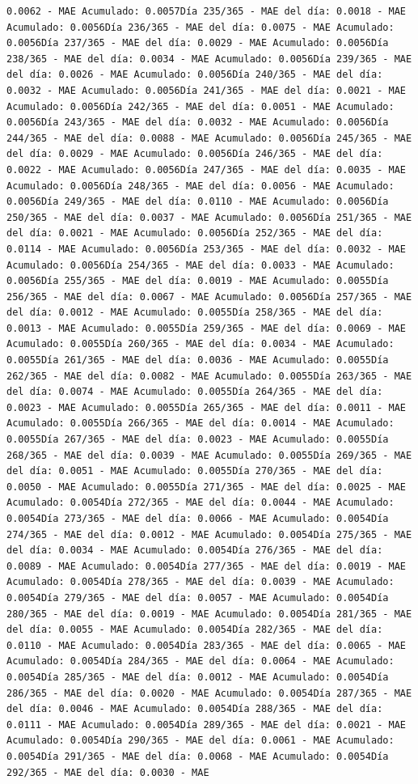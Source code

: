 \documentclass[
]{book}
\begin{document}
\begin{verbatim}
0.0062 - MAE Acumulado: 0.0057Día 235/365 - MAE del día: 0.0018 - MAE Acumulado: 0.0056Día 236/365 - MAE del día: 0.0075 - MAE Acumulado: 0.0056Día 237/365 - MAE del día: 0.0029 - MAE Acumulado: 0.0056Día 238/365 - MAE del día: 0.0034 - MAE Acumulado: 0.0056Día 239/365 - MAE del día: 0.0026 - MAE Acumulado: 0.0056Día 240/365 - MAE del día: 0.0032 - MAE Acumulado: 0.0056Día 241/365 - MAE del día: 0.0021 - MAE Acumulado: 0.0056Día 242/365 - MAE del día: 0.0051 - MAE Acumulado: 0.0056Día 243/365 - MAE del día: 0.0032 - MAE Acumulado: 0.0056Día 244/365 - MAE del día: 0.0088 - MAE Acumulado: 0.0056Día 245/365 - MAE del día: 0.0029 - MAE Acumulado: 0.0056Día 246/365 - MAE del día: 0.0022 - MAE Acumulado: 0.0056Día 247/365 - MAE del día: 0.0035 - MAE Acumulado: 0.0056Día 248/365 - MAE del día: 0.0056 - MAE Acumulado: 0.0056Día 249/365 - MAE del día: 0.0110 - MAE Acumulado: 0.0056Día 250/365 - MAE del día: 0.0037 - MAE Acumulado: 0.0056Día 251/365 - MAE del día: 0.0021 - MAE Acumulado: 0.0056Día 252/365 - MAE del día: 0.0114 - MAE Acumulado: 0.0056Día 253/365 - MAE del día: 0.0032 - MAE Acumulado: 0.0056Día 254/365 - MAE del día: 0.0033 - MAE Acumulado: 0.0056Día 255/365 - MAE del día: 0.0019 - MAE Acumulado: 0.0055Día 256/365 - MAE del día: 0.0067 - MAE Acumulado: 0.0056Día 257/365 - MAE del día: 0.0012 - MAE Acumulado: 0.0055Día 258/365 - MAE del día: 0.0013 - MAE Acumulado: 0.0055Día 259/365 - MAE del día: 0.0069 - MAE Acumulado: 0.0055Día 260/365 - MAE del día: 0.0034 - MAE Acumulado: 0.0055Día 261/365 - MAE del día: 0.0036 - MAE Acumulado: 0.0055Día 262/365 - MAE del día: 0.0082 - MAE Acumulado: 0.0055Día 263/365 - MAE del día: 0.0074 - MAE Acumulado: 0.0055Día 264/365 - MAE del día: 0.0023 - MAE Acumulado: 0.0055Día 265/365 - MAE del día: 0.0011 - MAE Acumulado: 0.0055Día 266/365 - MAE del día: 0.0014 - MAE Acumulado: 0.0055Día 267/365 - MAE del día: 0.0023 - MAE Acumulado: 0.0055Día 268/365 - MAE del día: 0.0039 - MAE Acumulado: 0.0055Día 269/365 - MAE del día: 0.0051 - MAE Acumulado: 0.0055Día 270/365 - MAE del día: 0.0050 - MAE Acumulado: 0.0055Día 271/365 - MAE del día: 0.0025 - MAE Acumulado: 0.0054Día 272/365 - MAE del día: 0.0044 - MAE Acumulado: 0.0054Día 273/365 - MAE del día: 0.0066 - MAE Acumulado: 0.0054Día 274/365 - MAE del día: 0.0012 - MAE Acumulado: 0.0054Día 275/365 - MAE del día: 0.0034 - MAE Acumulado: 0.0054Día 276/365 - MAE del día: 0.0089 - MAE Acumulado: 0.0054Día 277/365 - MAE del día: 0.0019 - MAE Acumulado: 0.0054Día 278/365 - MAE del día: 0.0039 - MAE Acumulado: 0.0054Día 279/365 - MAE del día: 0.0057 - MAE Acumulado: 0.0054Día 280/365 - MAE del día: 0.0019 - MAE Acumulado: 0.0054Día 281/365 - MAE del día: 0.0055 - MAE Acumulado: 0.0054Día 282/365 - MAE del día: 0.0110 - MAE Acumulado: 0.0054Día 283/365 - MAE del día: 0.0065 - MAE Acumulado: 0.0054Día 284/365 - MAE del día: 0.0064 - MAE Acumulado: 0.0054Día 285/365 - MAE del día: 0.0012 - MAE Acumulado: 0.0054Día 286/365 - MAE del día: 0.0020 - MAE Acumulado: 0.0054Día 287/365 - MAE del día: 0.0046 - MAE Acumulado: 0.0054Día 288/365 - MAE del día: 0.0111 - MAE Acumulado: 0.0054Día 289/365 - MAE del día: 0.0021 - MAE Acumulado: 0.0054Día 290/365 - MAE del día: 0.0061 - MAE Acumulado: 0.0054Día 291/365 - MAE del día: 0.0068 - MAE Acumulado: 0.0054Día 292/365 - MAE del día: 0.0030 - MAE 
\end{verbatim}
\end{document}
